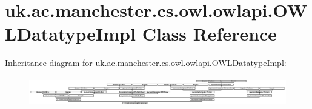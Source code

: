 \hypertarget{classuk_1_1ac_1_1manchester_1_1cs_1_1owl_1_1owlapi_1_1_o_w_l_datatype_impl}{\section{uk.\-ac.\-manchester.\-cs.\-owl.\-owlapi.\-O\-W\-L\-Datatype\-Impl Class Reference}
\label{classuk_1_1ac_1_1manchester_1_1cs_1_1owl_1_1owlapi_1_1_o_w_l_datatype_impl}
}
Inheritance diagram for uk.\-ac.\-manchester.\-cs.\-owl.\-owlapi.\-O\-W\-L\-Datatype\-Impl\-:\begin{figure}[H]
\begin{center}
\leavevmode
\includegraphics[height=1.268608cm]{classuk_1_1ac_1_1manchester_1_1cs_1_1owl_1_1owlapi_1_1_o_w_l_datatype_impl}
\end{center}
\end{figure}
